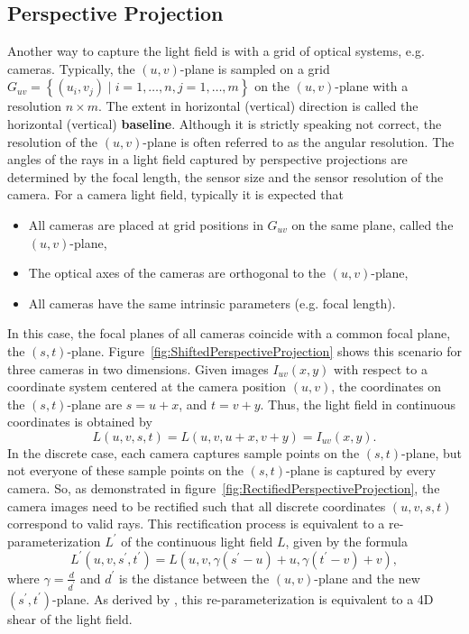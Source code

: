 \subsection*{Perspective Projection}
\begin{sloppypar}
	Another way to capture the light field is with a grid of optical systems, e.g. cameras.
	Typically, the $(u, v)$-plane is sampled on a grid $G_{uv} = \left \{ \left( u_i, v_j \right) \mid i = 1,\dots, n, j = 1, \dots, m\right \}$ on the $(u, v)$-plane with a resolution $n \times m$.
	The extent in horizontal (vertical) direction is called the horizontal (vertical) \textbf{baseline}.
	Although it is strictly speaking not correct, the resolution of the $(u, v)$-plane is often referred to as the angular resolution. 
	The angles of the rays in a light field captured by perspective projections are determined by the focal length, the sensor size and the sensor resolution of the camera.
	For a camera light field, typically it is expected that
	\begin{itemize}
		\item All cameras are placed at grid positions in $G_{uv}$ on the same plane, called the $(u, v)$-plane, 
		\item The optical axes of the cameras are orthogonal to the $(u, v)$-plane, 
		\item All cameras have the same intrinsic parameters (e.g. focal length).
	\end{itemize}
\end{sloppypar}
\noindent
In this case, the focal planes of all cameras coincide with a common focal plane, the $(s, t)$-plane.
Figure~\ref{fig:ShiftedPerspectiveProjection} shows this scenario for three cameras in two dimensions.
Given images $I_{uv}(x, y)$ with respect to a coordinate system centered at the camera position $(u, v)$, the coordinates on the $(s, t)$-plane are $s = u + x$, and $t = v + y$.
Thus, the light field in continuous coordinates is obtained by 
\begin{equation}
	L(u, v, s, t) = L(u, v, u + x, v + y) = I_{uv}(x, y).
\end{equation}
In the discrete case, each camera captures sample points on the $(s, t)$-plane, but not everyone of these sample points on the $(s, t)$-plane is captured by every camera.
So, as demonstrated in figure~\ref*{fig:RectifiedPerspectiveProjection}, the camera images need to be rectified such that all discrete coordinates $(u, v, s, t)$ correspond to valid rays.
This rectification process is equivalent to a re-parameterization $L^\prime$ of the continuous light field $L$, given by the formula
\begin{equation}\label{eq:two_plane_reparameterization}
	L^\prime (u, v, s^\prime, t^\prime) = L \left(u, v, \gamma (s^\prime - u) + u, \gamma (t^\prime - v) + v \right), 
\end{equation}
where $\gamma = \frac{d}{d^\prime}$ and $d^\prime$ is the distance between the $(u, v)$-plane and the new \mbox{$(s^\prime, t^\prime)$-plane}.
As derived by \cite{DynamicallyReparameterizedLF}, this re-parameterization is equivalent to a 4D shear of the light field.

